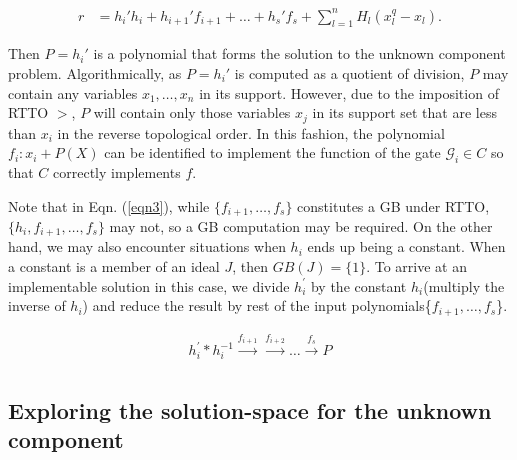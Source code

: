 \begin{align}
r & = h_i'h_i+h_{i+1}'f_{i+1}+\dots+h_s'f_s+ \sum_{l=1}^n H_l (x_l^q-x_l).
\end{align}

Then $P = h_i'$ is a polynomial that forms the solution to the
unknown component problem. Algorithmically, as $P = h_i'$ is computed
as a quotient of division, $P$ may contain any variables
$x_1,\dots,x_n$ in its support. However, due to the imposition of RTTO
$>$, $P$ will contain only those variables $x_j$ in its support set
that are less than $x_i$ in the reverse topological order. In this
fashion, the polynomial $f_i: x_i + P(X)$ can be identified to
implement the function of the gate $\mathcal{G}_i \in C$ so that $C$
correctly implements $f$. 

Note that in Eqn. (\ref{eqn3}), while $\{f_{i+1},\dots,f_s\}$
constitutes a GB under RTTO, $\{h_i,f_{i+1},\dots,f_s\}$
may not, so a GB computation may be required. On the other hand, we
may also encounter situations when $h_i$ ends up being a constant.
When a constant is a member of an ideal $J$, then $GB(J) = \{1\}$. To
arrive at an implementable solution in this case, we divide $h_i^{'}$
by the constant $h_i$(multiply the inverse of $h_i$) and reduce the result by
rest of the input polynomials\{$f_{i+1},\dots,f_s$\}.  

\begin{align}
h_i^{'}*h_i^{-1}\xrightarrow[]{f_{i+1}}\xrightarrow[]{f_{i+2}}\dots\xrightarrow[]{f_s}P
\end{align}



\subsection{Exploring the solution-space for the unknown component}



